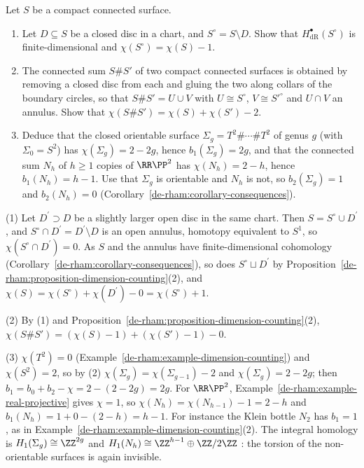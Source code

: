 \begin{exercise}\label{de-rham:exercise-genus-betti}
Let $S$ be a compact connected surface.
\begin{enumerate}
\item Let $D \subseteq S$ be a closed disc in a chart, and $S^\circ = S \setminus D$. Show that $H^\bullet_{\mathrm{dR}}(S^\circ)$ is finite-dimensional and $\chi(S^\circ) = \chi(S) - 1$.
\item The connected sum $S \# S'$ of two compact connected surfaces is obtained by removing a closed disc from each and gluing the two along collars of the boundary circles, so that $S \# S' = U \cup V$ with
$U \cong S^\circ$, $V \cong S'^\circ$ and $U \cap V$ an annulus. Show that $\chi(S \# S') = \chi(S) + \chi(S') - 2$.
\item Deduce that the closed orientable surface $\Sigma_g = T^2 \# \cdots \# T^2$ of genus $g$ (with $\Sigma_0 = S^2$) has $\chi(\Sigma_g) = 2 - 2g$, hence $b_1(\Sigma_g) = 2g$, and that the connected sum $N_h$ of
$h \geq 1$ copies of $\RR\PP^2$ has $\chi(N_h) = 2 - h$, hence $b_1(N_h) = h - 1$. Use that $\Sigma_g$ is orientable and $N_h$ is not, so $b_2(\Sigma_g) = 1$ and $b_2(N_h) = 0$
(Corollary~\ref{de-rham:corollary-consequences}).
\end{enumerate}
\end{exercise}

\begin{solution}
(1) Let $D^\prime \supset D$ be a slightly larger open disc in the same chart. Then $S = S^\circ \cup D^\prime$, and $S^\circ \cap D^\prime = D^\prime \setminus D$ is an open annulus, homotopy equivalent to $S^1$, so
$\chi(S^\circ \cap D^\prime) = 0$. As $S$ and the annulus have finite-dimensional cohomology (Corollary~\ref{de-rham:corollary-consequences}), so does $S^\circ \sqcup D^\prime$ by
Proposition~\ref{de-rham:proposition-dimension-counting}(2), and $\chi(S) = \chi(S^\circ) + \chi(D^\prime) - 0 = \chi(S^\circ) + 1$.

(2) By (1) and Proposition~\ref{de-rham:proposition-dimension-counting}(2), $\chi(S \# S') = (\chi(S) - 1) + (\chi(S') - 1) - 0$.

(3) $\chi(T^2) = 0$ (Example~\ref{de-rham:example-dimension-counting}) and $\chi(S^2) = 2$, so by (2) $\chi(\Sigma_g) = \chi(\Sigma_{g-1}) - 2$ and $\chi(\Sigma_g) = 2 - 2g$; then
$b_1 = b_0 + b_2 - \chi = 2 - (2 - 2g) = 2g$. For $\RR\PP^2$, Example~\ref{de-rham:example-real-projective} gives $\chi = 1$, so $\chi(N_h) = \chi(N_{h-1}) - 1 = 2 - h$ and $b_1(N_h) = 1 + 0 - (2 - h) = h - 1$. For instance the Klein bottle
$N_2$ has $b_1 = 1$, as in Example~\ref{de-rham:example-dimension-counting}(2). The integral homology is $H_1(\Sigma_g) \cong \ZZ^{2g}$ and $H_1(N_h) \cong \ZZ^{h-1} \oplus \ZZ/2\ZZ$ \cite{hatcher-at}: the torsion of the
non-orientable surfaces is again invisible.
\end{solution}

